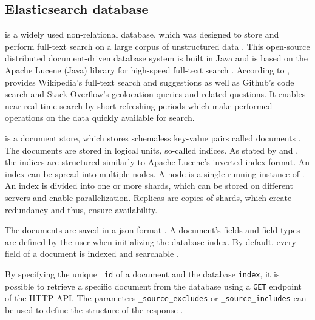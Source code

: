 \subsection{Elasticsearch database}\label{sec:db}

\databaseName{} is a widely used non-relational database, which was designed to store and perform full-text search on a large corpus of unstructured data \cite{Elasticsearch2017}.
This open-source distributed document-driven database system is built in Java and is based on the Apache Lucene (Java) library for high-speed full-text search \cite{Elasticsearch2017, Elasticsearch2019}.
According to \citeauthor{Elasticsearch2019}, \databaseName{} provides Wikipedia's full-text search 
and suggestions as well as Github's code search and Stack Overflow's geolocation queries and related questions.
It enables near real-time search by short refreshing periods which make performed operations on the data quickly available for search.

\databaseName{} is a document store, which stores schemaless key-value pairs called documents \cite{flask2018}.
The documents are stored in logical units, so-called indices.
As stated by \citeauthor{Elasticsearch2019} and \citeauthor{Elasticsearch2017}, the indices are structured similarly to Apache Lucene's inverted index format.
An index can be spread into multiple nodes.
A node is a single running instance of \databaseName{} \cite{Elasticsearch2019}.
An index is divided into one or more shards, which can be stored on different servers and enable parallelization.
Replicas are copies of shards, which create redundancy and thus, ensure availability. %

The documents are saved in a \ac{json} format \cite{Elasticsearch2017}.
A document's fields and field types are defined by the user when initializing the database index.
By default, every field of a document is indexed and searchable \cite{Elasticsearch2019}.

By specifying the unique \texttt{\_id} of a document and the database \texttt{index}, 
it is possible to retrieve a specific document from the database using a \texttt{GET} endpoint of the HTTP API.
The parameters \texttt{\_source\_excludes} or \texttt{\_source\_includes} can be used to define the structure of the response \cite{Elasticsearch-get}.

